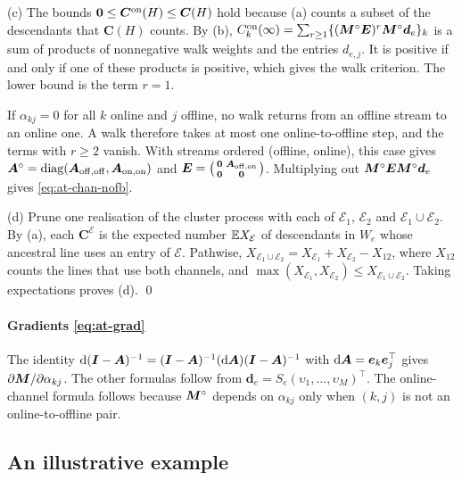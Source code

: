 (c) The bounds $\mathbf{0}\le\bm C^{\mathrm{on}}(H)\le\bm C(H)$ hold because (a) counts a
subset of the descendants that $\bm C(H)$ counts. By (b),
$C^{\mathrm{on}}_k(\infty)=\sum_{r\ge1}\{(\bm{M}^\circ\bm E)^r\bm{M}^\circ\bm d_e\}_k$ is a
sum of products of nonnegative walk weights and the entries $d_{e,j}$. It is positive
if and only if one of these products is positive, which gives the walk criterion. The
lower bound is the term $r=1$.

If $\alpha_{kj}=0$ for all $k$ online and $j$ offline, no walk returns from an offline
stream to an online one. A walk therefore takes at most one online-to-offline step,
and the terms with $r\ge2$ vanish. With streams ordered (offline, online), this case
gives
$\bm{A}^\circ=\operatorname{diag}(\bm{A}_{\mathrm{off},\mathrm{off}},\bm{A}_{\mathrm{on},\mathrm{on}})$
and $\bm E=\bigl(\begin{smallmatrix}\mathbf{0}&\bm{A}_{\mathrm{off},\mathrm{on}}\\\mathbf{0}&\mathbf{0}\end{smallmatrix}\bigr)$.
Multiplying out $\bm{M}^\circ\bm E\bm{M}^\circ\bm d_e$ gives \eqref{eq:at-chan-nofb}.

(d) Prune one realisation of the cluster process with each of $\mathcal E_1$,
$\mathcal E_2$ and $\mathcal E_1\cup\mathcal E_2$. By (a), each $\bm C^{\mathcal E}$ is
the expected number $\mathbb{E} X_{\mathcal E}$ of descendants in $W_e$ whose ancestral line
uses an entry of $\mathcal E$. Pathwise,
$X_{\mathcal E_1\cup\mathcal E_2}=X_{\mathcal E_1}+X_{\mathcal E_2}-X_{12}$, where
$X_{12}$ counts the lines that use both channels, and
$\max(X_{\mathcal E_1},X_{\mathcal E_2})\le X_{\mathcal E_1\cup\mathcal E_2}$. Taking
expectations proves (d). \qed

\paragraph{Gradients \eqref{eq:at-grad}} The identity
$\mathrm{d}(\bm{I}-\bm{A})^{-1}=(\bm{I}-\bm{A})^{-1}(\mathrm{d}\bm{A})(\bm{I}-\bm{A})^{-1}$ with
$\mathrm{d}\bm{A}=\bm e_k\bm e_j^{\top}$ gives $\partial\bm{M}/\partial\alpha_{kj}$. The other
formulas follow from $\bm d_e=S_e(\upsilon_1,\dots,\upsilon_M)^{\top}$. The online-channel
formula follows because $\bm{M}^\circ$ depends on $\alpha_{kj}$ only when $(k,j)$ is not
an online-to-offline pair.

\subsection{An illustrative example}\label{sec:at-example}


